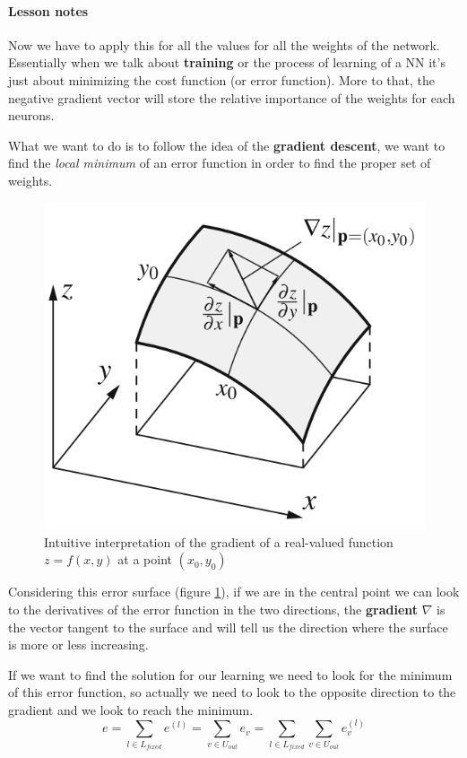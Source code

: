\documentclass{article}
\begin{document}
\paragraph{Lesson notes}
Now we have to apply this for all the values for all the weights of the network. Essentially when
we talk about \textbf{training} or the process of learning of a NN it's just about minimizing the
cost function (or error function). More to that, the negative gradient vector will store
the relative importance of the weights for each neurons.

What we want to do is to follow the idea of the \textbf{gradient descent}, we want
to find the \textit{local minimum} of an error function in order to find the proper set of weights.

\begin{figure}[H]
    \centering
    \includegraphics[scale=0.5]{images/gradienmt.png}
    \caption{Intuitive interpretation of the gradient of a real-valued function $z=f(x,y)$ at
        a point $(x_0,y_0)$}
    \label{fig:err_surface}
\end{figure}

Considering this error surface (figure \ref{fig:err_surface}), if we are in the
central point we can look to the derivatives of the error function in the two directions,
the \textbf{gradient} $\nabla$ is the vector tangent to the surface and will tell us the direction where
the surface is more or less increasing.

If we want to find the solution for our learning we need to look for the minimum of this
error function, so actually we need to look to the opposite direction to the gradient and we
look to reach the minimum.
$$e=\sum_{l\in L_{fixed}}e^{(l)} =\sum_{v\in U_{out}} e_v=\sum_{l\in L_{fixed}}\sum_{v\in U_{out}}e_v^{(l)}$$
\end{document}
